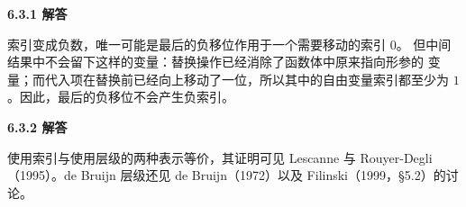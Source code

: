 \begin{taplauthorsolutionentrybox}
\label{sol:author:6.3.1}
\textbf{6.3.1 解答}

索引变成负数，唯一可能是最后的负移位作用于一个需要移动的索引 \(0\)。
但中间结果中不会留下这样的变量：替换操作已经消除了函数体中原来指向形参的
变量；而代入项在替换前已经向上移动了一位，所以其中的自由变量索引都至少为
\(1\)。因此，最后的负移位不会产生负索引。


\end{taplauthorsolutionentrybox}

\begin{taplauthorsolutionentrybox}
\label{sol:author:6.3.2}
\textbf{6.3.2 解答}

使用索引与使用层级的两种表示等价，其证明可见 Lescanne 与
Rouyer-Degli（1995）。de Bruijn 层级还见 de Bruijn（1972）以及
Filinski（1999，\S5.2）的讨论。

\end{taplauthorsolutionentrybox}
